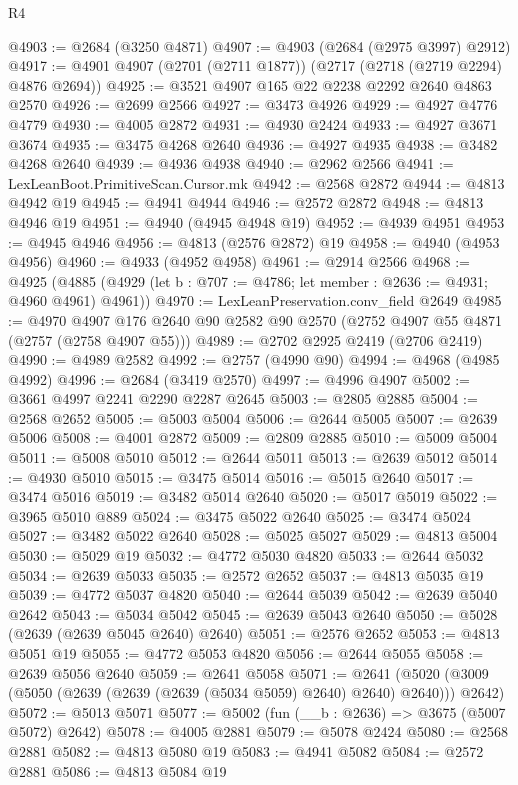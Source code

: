 \begin{lexlean}{R4}
\begin{coremodule}
@4903 := @2684 (@3250 @4871)
@4907 := @4903 (@2684 (@2975 @3997) @2912)
@4917 := @4901 @4907 (@2701 (@2711 @1877)) (@2717 (@2718 (@2719 @2294) @4876 @2694))
@4925 := @3521 @4907 @165 @22 @2238 @2292 @2640 @4863 @2570
@4926 := @2699 @2566
@4927 := @3473 @4926
@4929 := @4927 @4776 @4779
@4930 := @4005 @2872
@4931 := @4930 @2424
@4933 := @4927 @3671 @3674
@4935 := @3475 @4268 @2640
@4936 := @4927 @4935
@4938 := @3482 @4268 @2640
@4939 := @4936 @4938
@4940 := @2962 @2566
@4941 := LexLeanBoot.PrimitiveScan.Cursor.mk
@4942 := @2568 @2872
@4944 := @4813 @4942 @19
@4945 := @4941 @4944
@4946 := @2572 @2872
@4948 := @4813 @4946 @19
@4951 := @4940 (@4945 @4948 @19)
@4952 := @4939 @4951
@4953 := @4945 @4946
@4956 := @4813 (@2576 @2872) @19
@4958 := @4940 (@4953 @4956)
@4960 := @4933 (@4952 @4958)
@4961 := @2914 @2566
@4968 := @4925
    (@4885 (@4929 (let b : @707 := @4786; let member : @2636 := @4931; @4960 @4961) @4961))
@4970 := LexLeanPreservation.conv_field @2649
@4985 := @4970
    @4907
    @176
    @2640
    @90
    @2582
    @90
    @2570
    (@2752 @4907 @55 @4871 (@2757 (@2758 @4907 @55)))
@4989 := @2702 @2925 @2419 (@2706 @2419)
@4990 := @4989 @2582
@4992 := @2757 (@4990 @90)
@4994 := @4968 (@4985 @4992)
@4996 := @2684 (@3419 @2570)
@4997 := @4996 @4907
@5002 := @3661 @4997 @2241 @2290 @2287 @2645
@5003 := @2805 @2885
@5004 := @2568 @2652
@5005 := @5003 @5004
@5006 := @2644 @5005
@5007 := @2639 @5006
@5008 := @4001 @2872
@5009 := @2809 @2885
@5010 := @5009 @5004
@5011 := @5008 @5010
@5012 := @2644 @5011
@5013 := @2639 @5012
@5014 := @4930 @5010
@5015 := @3475 @5014
@5016 := @5015 @2640
@5017 := @3474 @5016
@5019 := @3482 @5014 @2640
@5020 := @5017 @5019
@5022 := @3965 @5010 @889
@5024 := @3475 @5022 @2640
@5025 := @3474 @5024
@5027 := @3482 @5022 @2640
@5028 := @5025 @5027
@5029 := @4813 @5004
@5030 := @5029 @19
@5032 := @4772 @5030 @4820
@5033 := @2644 @5032
@5034 := @2639 @5033
@5035 := @2572 @2652
@5037 := @4813 @5035 @19
@5039 := @4772 @5037 @4820
@5040 := @2644 @5039
@5042 := @2639 @5040 @2642
@5043 := @5034 @5042
@5045 := @2639 @5043 @2640
@5050 := @5028 (@2639 (@2639 @5045 @2640) @2640)
@5051 := @2576 @2652
@5053 := @4813 @5051 @19
@5055 := @4772 @5053 @4820
@5056 := @2644 @5055
@5058 := @2639 @5056 @2640
@5059 := @2641 @5058
@5071 := @2641 (@5020 (@3009 (@5050 (@2639 (@2639 (@2639 (@5034 @5059) @2640) @2640) @2640))) @2642)
@5072 := @5013 @5071
@5077 := @5002 (fun (__b : @2636) => @3675 (@5007 @5072) @2642)
@5078 := @4005 @2881
@5079 := @5078 @2424
@5080 := @2568 @2881
@5082 := @4813 @5080 @19
@5083 := @4941 @5082
@5084 := @2572 @2881
@5086 := @4813 @5084 @19

\end{coremodule}
\end{lexlean}

